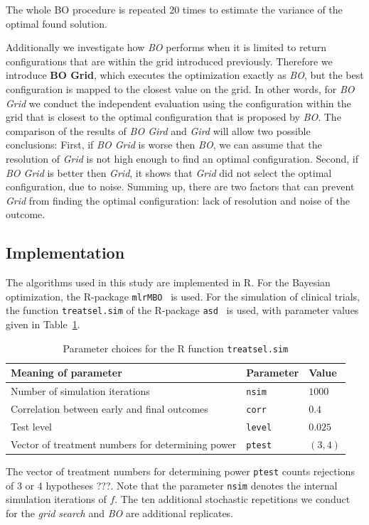 \documentclass[bimj,fleqn]{w-art}
\theoremstyle{plain}
\theoremstyle{definition}
\begin{document}
The whole BO procedure is repeated $20$ times to estimate the variance of the optimal found solution.

Additionally we investigate how \emph{BO} performs when it is limited to return configurations that are within the grid introduced previously.
Therefore we introduce \textbf{BO Grid}, which executes the optimization exactly as \emph{BO}, but the best configuration is mapped to the closest value on the grid. 
In other words, for \emph{BO Grid} we conduct the independent evaluation using the configuration within the grid that is closest to the optimal configuration that is proposed by \emph{BO}.
The comparison of the results of \emph{BO Gird} and \emph{Gird} will allow two possible conclusions:
First, if \emph{BO Grid} is worse then \emph{BO}, we can assume that the resolution of \emph{Grid} is not high enough to find an optimal configuration.
Second, if \emph{BO Grid} is better then \emph{Grid}, it shows that \emph{Grid} did not select the optimal configuration, due to noise.
Summing up, there are two factors that can prevent \emph{Grid} from finding the optimal configuration: lack of resolution and noise of the outcome.

\subsection{Implementation}

The algorithms used in this study are implemented in R.
For the Bayesian optimization, the R-package \texttt{mlrMBO}~\citep{bischl_mlrmbo_2017} is used.
For the simulation of clinical trials, the function \texttt{treatsel.sim} of the R-package \texttt{asd}~\citep{parsons_software_2011} is used, with parameter values given in Table~\ref{tab:par_implement}.
\begin{table}[h]
  \caption{Parameter choices for the R function \texttt{treatsel.sim}}
  \label{tab:par_implement}
  \centering
  \begin{tabular}{lll}
  \hline
  Meaning of parameter & Parameter & Value \\
  \hline
  Number of simulation iterations & \texttt{nsim} & $1000$ \\
  Correlation between early and final outcomes & \texttt{corr} & $0.4$ \\
  Test level & \texttt{level} & $0.025$ \\
  Vector of treatment numbers for determining power & \texttt{ptest} & $(3,4)$ \\
  \hline
  \end{tabular}
\end{table}
The vector of treatment numbers for determining power \texttt{ptest} counts rejections of 3 or 4 hypotheses ???.
Note that the parameter \texttt{nsim} denotes the internal simulation iterations of $f$. 
The ten additional stochastic repetitions we conduct for the \emph{grid search} and \emph{BO} are additional replicates.
\end{document}
